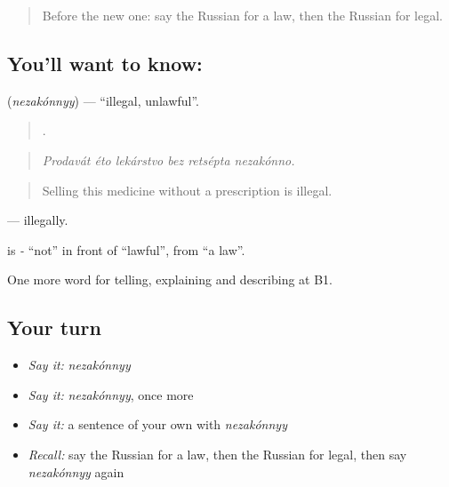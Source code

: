 \label{lesson:RU-C388-nezakonnyy}



\begin{quote}
Before the new one: say the Russian for a law, then the Russian for legal.
\end{quote}

\subsection*{You'll want to know: }
\textbf{} (\emph{nezakónnyy}) — \textquotedblleft{}illegal, unlawful\textquotedblright{}.

\begin{quote}
     .
\end{quote}

\begin{quote}
\emph{Prodavát éto lekárstvo bez retsépta nezakónno.}
\end{quote}

\begin{quote}
Selling this medicine without a prescription is illegal.
\end{quote}

\emph{} — illegally.

\begin{cousinweb}
\textbf{} is \emph{-} \textquotedblleft{}not\textquotedblright{} in front of \emph{} \textquotedblleft{}lawful\textquotedblright{}, from \emph{} \textquotedblleft{}a law\textquotedblright{}.
\end{cousinweb}

\begin{grammarlens}[title={What you've built}]
One more word for telling, explaining and describing at B1.
\end{grammarlens}

\subsection*{Your turn}
\begin{itemize}
\raggedright
  \item \emph{Say it:} \emph{nezakónnyy}
  \item \emph{Say it:} \emph{nezakónnyy}, once more
  \item \emph{Say it:} a sentence of your own with \emph{nezakónnyy}
  \item \emph{Recall:} say the Russian for a law, then the Russian for legal, then say \emph{nezakónnyy} again
\end{itemize}

